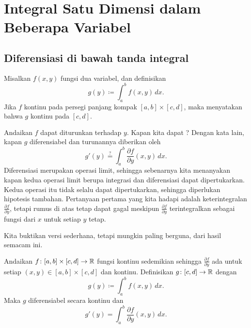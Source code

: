 \chapter{Integral Satu Dimensi dalam Beberapa Variabel} \label{path:chapter}


\section{Diferensiasi di bawah tanda integral}
\label{sec:diffunderint}


Misalkan $f(x,y)$ fungsi dua variabel, dan definisikan
\begin{equation*}
g(y) \coloneqq \int_a^b f(x,y) \,dx .
\end{equation*}
Jika $f$ kontinu pada persegi panjang kompak $[a,b] \times [c,d]$, maka
menyatakan bahwa $g$ kontinu pada $[c,d]$.

Andaikan $f$ dapat diturunkan terhadap $y$.  
Kapan kita dapat ?
Dengan kata lain, kapan $g$ diferensiabel dan turunannya diberikan oleh
\begin{equation*}
g'(y) \overset{?}{=} \int_a^b \frac{\partial f}{\partial y}(x,y) \,dx .
\end{equation*}
Diferensiasi merupakan operasi limit, sehingga sebenarnya kita menanyakan kapan
kedua operasi limit berupa integrasi dan diferensiasi dapat dipertukarkan.
Kedua operasi itu tidak selalu dapat dipertukarkan, sehingga diperlukan hipotesis
tambahan.  Pertanyaan pertama
yang kita hadapi adalah keterintegralan
$\frac{\partial f}{\partial y}$, tetapi rumus di atas tetap dapat gagal meskipun
$\frac{\partial f}{\partial y}$ terintegralkan sebagai fungsi dari $x$ untuk setiap
$y$ tetap.

Kita buktikan versi sederhana, tetapi mungkin paling berguna, dari hasil semacam ini.

\begin{thm}
Andaikan $f \colon [a,b] \times [c,d] \to {\mathbb{R}}$ fungsi kontinu
sedemikian sehingga $\frac{\partial f}{\partial y}$ ada untuk setiap $(x,y) \in [a,b]
\times [c,d]$ dan kontinu.  Definisikan $g \colon [c,d] \to {\mathbb{R}}$ dengan
\begin{equation*}
g(y) \coloneqq \int_a^b f(x,y) \,dx .
\end{equation*}
Maka $g$ diferensiabel secara kontinu dan
\begin{equation*}
g'(y) = \int_a^b \frac{\partial f}{\partial y}(x,y) \,dx .
\end{equation*}
\end{thm}

